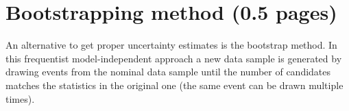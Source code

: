 
\section{Bootstrapping method (0.5 pages)}
\label{sec:dataanalysis:bootstrapping}

An alternative to get proper uncertainty estimates is the bootstrap method. In
this frequentist model-independent approach a new data sample is generated by
drawing events from the nominal data sample until the number of candidates
matches the statistics in the original one (the same event can be drawn
multiple times).